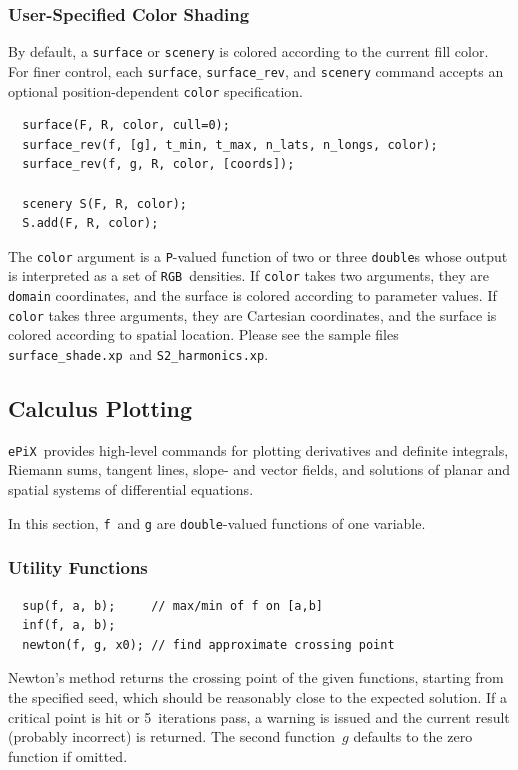 \documentclass[12pt,letterpaper]{book}
\newcommand{\code}[1]{\texttt{#1}}
\newcommand{\filename}[1]{\texttt{#1}}
\newcommand{\ePiX}{\code{ePiX}}
\newcommand{\teximath}[1]{$#1$}
\newcommand{\findex}[1]{\ignorespaces}
\begin{document}
\subsubsection*{User-Specified Color Shading}

By default, a \code{surface} or \code{scenery} is colored according to
the current fill color. For finer control, each \code{surface},
\code{surface\_rev}, and \code{scenery} command accepts an optional
position-dependent \code{color} specification.
\findex{surface}
\findex{surface\_rev}
\findex{scenery}
\findex{scenery.add}
\begin{verbatim}
  surface(F, R, color, cull=0);
  surface_rev(f, [g], t_min, t_max, n_lats, n_longs, color);
  surface_rev(f, g, R, color, [coords]);

  scenery S(F, R, color);
  S.add(F, R, color);
\end{verbatim}
The \code{color} argument is a \code{P}-valued function of two or
three \code{double}s whose output is interpreted as a set of
\code{RGB}~densities. If \code{color} takes two arguments, they are
\code{domain} coordinates, and the surface is colored according to
parameter values. If \code{color} takes three arguments, they are
Cartesian coordinates, and the surface is colored according to spatial
location.  Please see the sample files
\filename{surface\_shade.xp}~and \filename{S2\_harmonics.xp}. 


\subsection{Calculus Plotting} 

\ePiX\ provides high-level commands for plotting derivatives and
definite integrals, Riemann sums, tangent lines, slope- and vector
fields, and solutions of planar and spatial systems of differential
equations.

In this section, \code{f}~and \code{g} are \code{double}-valued
functions of one variable.

\subsubsection*{Utility Functions}

\findex{sup}
\findex{inf}
\findex{newton}
\begin{verbatim}
  sup(f, a, b);     // max/min of f on [a,b]
  inf(f, a, b);
  newton(f, g, x0); // find approximate crossing point
\end{verbatim}
Newton's method returns the crossing point of the given functions,
starting from the specified seed, which should be reasonably close to
the expected solution. If a critical point is hit or 5~iterations
pass, a warning is issued and the current result (probably incorrect)
is returned. The second function~\teximath{g} defaults to the zero function if
omitted.
\end{document}
